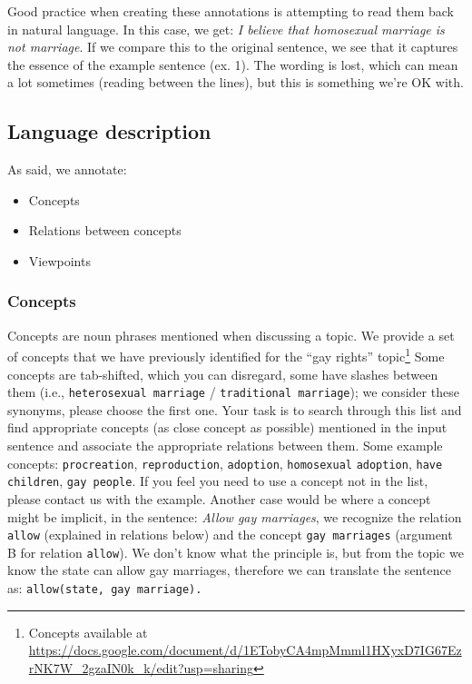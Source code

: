 Good practice when creating these annotations is attempting to read them back
in natural language. In this case, we get: \emph{I believe that homosexual marriage
is not marriage}.  If we compare this to the original sentence, we see that it
captures the essence of the example sentence (ex. 1). The wording is lost,
which can mean a lot sometimes (reading between the lines), but this is
something we’re OK with.

\subsection*{Language description}

As said, we annotate:
\begin{itemize}
\item Concepts
\item Relations between concepts
\item Viewpoints
\end{itemize}

\subsubsection*{Concepts}

Concepts are noun phrases mentioned when discussing a topic. We provide a set
of concepts that we have previously identified for the ``gay rights'' topic\footnote{
Concepts available at 
\url{https://docs.google.com/document/d/1ETobyCA4mpMmml1HXyxD7IG67EzrNK7W_2gzaIN0k_k/edit?usp=sharing}
}
Some concepts are tab-shifted, which you can disregard, some have
slashes between them (i.e., \texttt{heterosexual marriage} / \texttt{traditional marriage}); we
consider these synonyms, please choose the first one. Your task is to search
through this list and find appropriate concepts (as close concept as possible)
mentioned in the input sentence and associate the appropriate relations between
them. Some example concepts: \texttt{procreation}, \texttt{reproduction}, \texttt{adoption}, \texttt{homosexual}
\texttt{adoption}, \texttt{have children}, \texttt{gay people}. 
If you feel you need to use a concept not
in the list, please contact us with the example. Another case would be where a
concept might be implicit, in the sentence: \textit{Allow gay marriages}, we recognize
the relation \texttt{allow} (explained in relations below) and the concept \texttt{gay marriages}
(argument B for relation \texttt{allow}).  We don’t know what the principle is, but from
the topic we know the state can allow gay marriages, therefore we can translate
the sentence as: \texttt{allow(state, gay marriage).}


